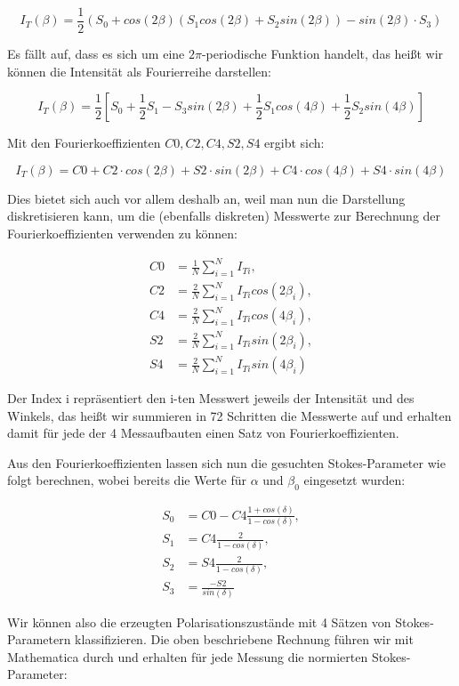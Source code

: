 \documentclass[bigchapter,colorback,accentcolor=tud4b,linedtoc,11pt]{tudreport}
\begin{document}
$$I_T(\beta) = \frac{1}{2} (S_0 + cos(2 \beta) (S_1 cos(2 \beta) + S_2 sin(2 \beta)) - sin(2 \beta) \cdot S_3 )$$

Es fällt auf, dass es sich um eine $2 \pi$-periodische Funktion handelt, das heißt wir können die Intensität als Fourierreihe darstellen: 

$$I_T(\beta) = \frac{1}{2} [S_0 + \frac{1}{2} S_1 - S_3 sin(2 \beta) + \frac{1}{2} S_1 cos(4 \beta) + \frac{1}{2} S_2 sin(4 \beta)]$$

Mit den Fourierkoeffizienten $C0, C2, C4, S2, S4$ ergibt sich: 

$$I_T(\beta) = C0 + C2 \cdot cos(2 \beta) + S2 \cdot sin (2 \beta) + C4 \cdot cos (4 \beta) + S4 \cdot sin (4 \beta)$$

Dies bietet sich auch vor allem deshalb an, weil man nun die Darstellung diskretisieren kann, um die (ebenfalls diskreten) Messwerte zur Berechnung der Fourierkoeffizienten verwenden zu können:

\begin{align*}
 C0 &= \frac{1}{N} \sum_{i=1}^N I_{Ti},\\
 C2 &= \frac{2}{N} \sum_{i=1}^N I_{Ti} cos(2 \beta_i),\\
 C4 &= \frac{2}{N} \sum_{i=1}^N I_{Ti} cos(4 \beta_i),\\
 S2 &= \frac{2}{N} \sum_{i=1}^N I_{Ti} sin(2 \beta_i),\\
 S4 &= \frac{2}{N} \sum_{i=1}^N I_{Ti} sin(4 \beta_i)
\end{align*}

Der Index i repräsentiert den i-ten Messwert jeweils der Intensität und des Winkels, das heißt wir summieren in 72 Schritten die Messwerte auf und erhalten damit für jede der 4 Messaufbauten einen Satz von Fourierkoeffizienten.

Aus den Fourierkoeffizienten lassen sich nun die gesuchten Stokes-Parameter wie folgt berechnen, wobei bereits die Werte für $\alpha$ und $\beta_0$ eingesetzt wurden: 

\begin{align*}
 S_0 &= C0 - C4 \frac{1 + cos(\delta)}{1 - cos(\delta)},\\ 
 S_1 &= C4 \frac{2}{1 - cos(\delta)},\\
 S_2 &= S4 \frac{2}{1 - cos(\delta)},\\
 S_3 &= \frac{-S2}{sin(\delta)} 
\end{align*}

Wir können also die erzeugten Polarisationszustände mit 4 Sätzen von Stokes-Parametern klassifizieren. Die oben beschriebene Rechnung führen wir mit Mathematica durch und erhalten für jede Messung die normierten Stokes-Parameter:
\end{document}
